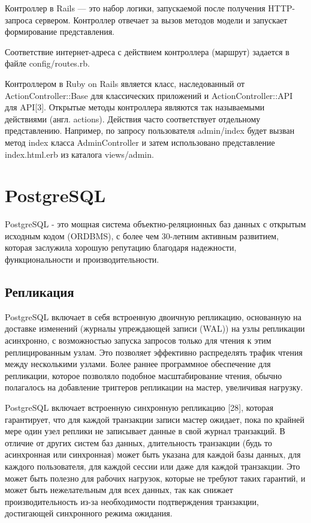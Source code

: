 Контроллер в Rails — это набор логики, запускаемой после получения HTTP-запроса сервером. Контроллер отвечает за вызов методов модели и запускает формирование представления.

Соответствие интернет-адреса с действием контроллера (маршрут) задается в файле config/routes.rb.

Контроллером в Ruby on Rails является класс, наследованный от ActionController::Base для классических приложений и ActionController::API для API[3]. Открытые методы контроллера являются так называемыми действиями (англ. actions). Действия часто соответствует отдельному представлению. Например, по запросу пользователя admin/index будет вызван метод index класса AdminController и затем использовано представление index.html.erb из каталога views/admin.

\section{PostgreSQL}\label{sec:ch3/sect3}
PostgreSQL - это мощная система объектно-реляционных баз данных с открытым исходным кодом (ORDBMS), с более чем 30-летним активным развитием, которая заслужила хорошую репутацию благодаря надежности, функциональности и производительности.

\subsection{Репликация}\label{sec:subs1}

PostgreSQL включает в себя встроенную двоичную репликацию, основанную на доставке изменений (журналы упреждающей записи (WAL)) на узлы репликации асинхронно, с возможностью запуска запросов только для чтения к этим реплицированным узлам. Это позволяет эффективно распределять трафик чтения между несколькими узлами. Более раннее программное обеспечение для репликации, которое позволяло подобное масштабирование чтения, обычно полагалось на добавление триггеров репликации на мастер, увеличивая нагрузку.


PostgreSQL включает встроенную синхронную репликацию [28], которая гарантирует, что для каждой транзакции записи мастер ожидает, пока по крайней мере один узел реплики не записывает данные в свой журнал транзакций. В отличие от других систем баз данных, длительность транзакции (будь то асинхронная или синхронная) может быть указана для каждой базы данных, для каждого пользователя, для каждой сессии или даже для каждой транзакции. Это может быть полезно для рабочих нагрузок, которые не требуют таких гарантий, и может быть нежелательным для всех данных, так как снижает производительность из-за необходимости подтверждения транзакции, достигающей синхронного режима ожидания.


